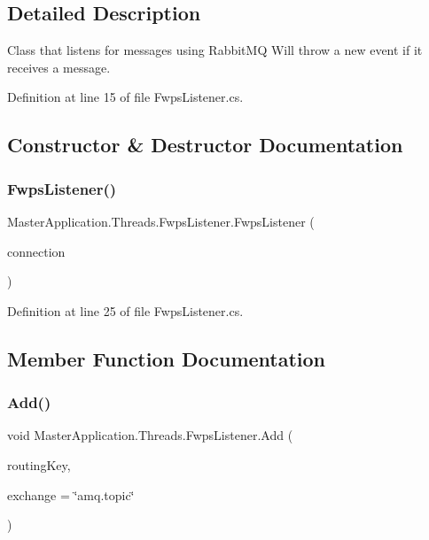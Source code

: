 \subsection{Detailed Description}
Class that listens for messages using Rabbit\+MQ Will throw a new event if it receives a message. 

Definition at line 15 of file Fwps\+Listener.\+cs.



\subsection{Constructor \& Destructor Documentation}
\mbox{\label{class_master_application_1_1_threads_1_1_fwps_listener_adf0a8a6efaa73852384016f2bdef71eb}} 
\subsubsection{\texorpdfstring{Fwps\+Listener()}{FwpsListener()}}
{\footnotesize\ttfamily Master\+Application.\+Threads.\+Fwps\+Listener.\+Fwps\+Listener (\begin{DoxyParamCaption}\item[{I\+Connection}]{connection }\end{DoxyParamCaption})}



Definition at line 25 of file Fwps\+Listener.\+cs.



\subsection{Member Function Documentation}
\mbox{\label{class_master_application_1_1_threads_1_1_fwps_listener_ae19201bd86b5f5d21b6d140794ecbdbc}} 
\subsubsection{\texorpdfstring{Add()}{Add()}}
{\footnotesize\ttfamily void Master\+Application.\+Threads.\+Fwps\+Listener.\+Add (\begin{DoxyParamCaption}\item[{string}]{routing\+Key,  }\item[{string}]{exchange = {\ttfamily \char`\"{}amq.topic\char`\"{}} }\end{DoxyParamCaption})}



